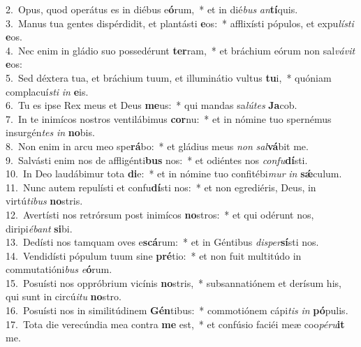 {2.~}Opus, quod operátus es in diébus e\textbf{ó}rum,~* et in dié\textit{bus} \textit{an}\textbf{tí}quis.\\
{3.~}Manus tua gentes dispérdidit, et plantásti \textbf{e}os:~* afflixísti pópulos, et expu\textit{lí}\textit{sti} \textbf{e}os.\\
{4.~}Nec enim in gládio suo possedérunt \textbf{ter}ram,~* et bráchium eórum non sal\textit{vá}\textit{vit} \textbf{e}os:\\
{5.~}Sed déxtera tua, et bráchium tuum, et illuminátio vultus \textbf{tu}i,~* quóniam complacuí\textit{sti} \textit{in} \textbf{e}is.\\
{6.~}Tu es ipse Rex meus et Deus \textbf{me}us:~* qui mandas sa\textit{lú}\textit{tes} \textbf{Ja}cob.\\
{7.~}In te inimícos nostros ventilábimus \textbf{cor}nu:~* et in nómine tuo spernémus insurgén\textit{tes} \textit{in} \textbf{no}bis.\\
{8.~}Non enim in arcu meo spe\textbf{rá}bo:~* et gládius meus \textit{non} \textit{sal}\textbf{vá}bit me.\\
{9.~}Salvásti enim nos de affligénti\textbf{bus} nos:~* et odiéntes nos \textit{con}\textit{fu}\textbf{dí}sti.\\
{10.~}In Deo laudábimur tota \textbf{di}e:~* et in nómine tuo confitébi\textit{mur} \textit{in} \textbf{sǽ}culum.\\
{11.~}Nunc autem repulísti et confu\textbf{dí}sti nos:~* et non egrediéris, Deus, in virtú\textit{ti}\textit{bus} \textbf{no}stris.\\
{12.~}Avertísti nos retrórsum post inimícos \textbf{no}stros:~* et qui odérunt nos, diripi\textit{é}\textit{bant} \textbf{si}bi.\\
{13.~}Dedísti nos tamquam oves e\textbf{scá}rum:~* et in Géntibus \textit{di}\textit{sper}\textbf{sí}sti nos.\\
{14.~}Vendidísti pópulum tuum sine \textbf{pré}tio:~* et non fuit multitúdo in commutatióni\textit{bus} \textit{e}\textbf{ó}rum.\\
{15.~}Posuísti nos oppróbrium vicínis \textbf{no}stris,~* subsannatiónem et derísum his, qui sunt in circú\textit{i}\textit{tu} \textbf{no}stro.\\
{16.~}Posuísti nos in similitúdinem \textbf{Gén}tibus:~* commotiónem cápi\textit{tis} \textit{in} \textbf{pó}pulis.\\
{17.~}Tota die verecúndia mea contra \textbf{me} est,~* et confúsio faciéi meæ coo\textit{pé}\textit{ru}\textbf{it} me.\\

